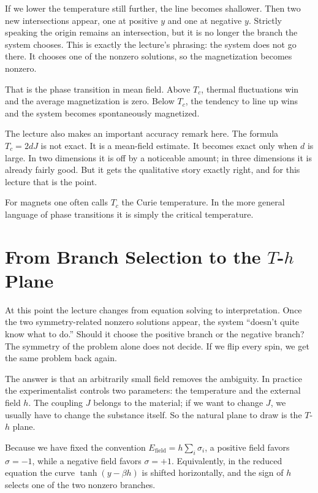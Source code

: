 If we lower the temperature still further, the line becomes shallower. Then two new intersections appear, one at positive \(y\) and one at negative \(y\). Strictly speaking the origin remains an intersection, but it is no longer the branch the system chooses. This is exactly the lecture's phrasing: the system does not go there. It chooses one of the nonzero solutions, so the magnetization becomes nonzero.

That is the phase transition in mean field. Above \(T_c\), thermal fluctuations win and the average magnetization is zero. Below \(T_c\), the tendency to line up wins and the system becomes spontaneously magnetized.

The lecture also makes an important accuracy remark here. The formula \(T_c=2dJ\) is not exact. It is a mean-field estimate. It becomes exact only when \(d\) is large. In two dimensions it is off by a noticeable amount; in three dimensions it is already fairly good. But it gets the qualitative story exactly right, and for this lecture that is the point.

For magnets one often calls \(T_c\) the Curie temperature. In the more general language of phase transitions it is simply the critical temperature.

\section{From Branch Selection to the \(T\)-\(h\) Plane}

At this point the lecture changes from equation solving to interpretation. Once the two symmetry-related nonzero solutions appear, the system ``doesn't quite know what to do.'' Should it choose the positive branch or the negative branch? The symmetry of the problem alone does not decide. If we flip every spin, we get the same problem back again.

The answer is that an arbitrarily small field removes the ambiguity. In practice the experimentalist controls two parameters: the temperature and the external field \(h\). The coupling \(J\) belongs to the material; if we want to change \(J\), we usually have to change the substance itself. So the natural plane to draw is the \(T\)-\(h\) plane.

Because we have fixed the convention \(E_{\text{field}}=h\sum_i \sigma_i\), a positive field favors \(\sigma=-1\), while a negative field favors \(\sigma=+1\). Equivalently, in the reduced equation the curve \(\tanh(y-\beta h)\) is shifted horizontally, and the sign of \(h\) selects one of the two nonzero branches.

